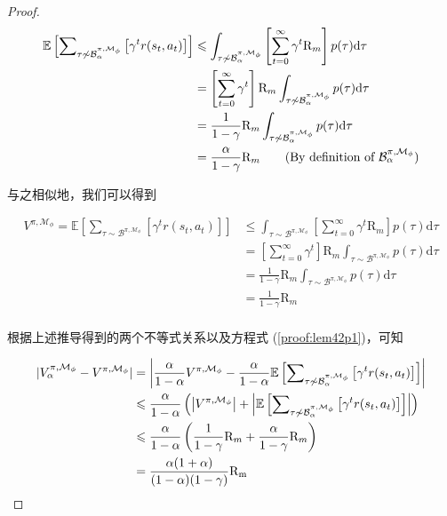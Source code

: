 \begin{proof}
\begin{align*}
\mathbb{E}\left[{\sum}_{\tau \not\sim\mathcal{B}_\alpha^{\pi,\mathcal{M}_\phi}}\left[\gamma^t r(s_t,a_t)\right]\right] &\leq\int_{\tau\not\sim{\mathcal{B}_\alpha^{\pi,\mathcal{M}_\phi}}}\left[\sum_{t=0}^\infty\gamma^t \mathrm{R}_m\right]p(\tau)\mathrm{d}\tau\\
&=\left[\sum_{t=0}^\infty\gamma^t\right]\mathrm{R}_m\int_{\tau\not\sim{\mathcal{B}_\alpha^{\pi,\mathcal{M}_\phi}}}p(\tau)\mathrm{d}\tau\\
&= \frac{1}{1-\gamma}\mathrm{R}_m \int_{\tau\not\sim{\mathcal{B}_\alpha^{\pi,\mathcal{M}_\phi}}}p(\tau)\mathrm{d}\tau\\
&=\frac{\alpha}{1-\gamma}\mathrm{R}_m \tag{By definition of $\mathcal{B}_\alpha^{\pi,\mathcal{M}_\phi}$}\\
\end{align*}

与之相似地，我们可以得到

\begin{align*}
V^{\pi,\mathcal{M}_\phi} = \mathbb{E}\left[{\sum}_{\tau \sim\mathcal{B}^{\pi,\mathcal{M}_\phi}}\left[\gamma^t r(s_t,a_t)\right]\right] &\leq\int_{\tau \sim\mathcal{B}^{\pi,\mathcal{M}_\phi}}\left[\sum_{t=0}^\infty\gamma^t \mathrm{R}_m\right]p(\tau)\mathrm{d}\tau\\
&=\left[\sum_{t=0}^\infty\gamma^t\right]\mathrm{R}_m\int_{\tau \sim\mathcal{B}^{\pi,\mathcal{M}_\phi}}p(\tau)\mathrm{d}\tau\\
&= \frac{1}{1-\gamma}\mathrm{R}_m \int_{\tau \sim\mathcal{B}^{\pi,\mathcal{M}_\phi}}p(\tau)\mathrm{d}\tau\\
&=\frac{1}{1-\gamma}\mathrm{R}_m\\
\end{align*}

根据上述推导得到的两个不等式关系以及方程式 (\ref{proof:lem42p1})，可知

\begin{align}
|{V}_\alpha^{\pi, \mathcal{M}_{\phi}} - {V}^{\pi,\mathcal{M}_{\phi}}| &=  \left|\frac{\alpha}{1-\alpha}V^{\pi,\mathcal{M}_\phi}-\frac{\alpha}{1-\alpha}\mathbb{E}\left[{\sum}_{\tau \not\sim\mathcal{B}_\alpha^{\pi,\mathcal{M}_\phi}}\left[\gamma^t r(s_t,a_t)\right]\right]\right| \notag\\
&\leq\frac{\alpha}{1-\alpha}\left(\left|V^{\pi,\mathcal{M}_\phi}\right|+\left|\mathbb{E}\left[{\sum}_{\tau \not\sim\mathcal{B}_\alpha^{\pi,\mathcal{M}_\phi}}\left[\gamma^t r(s_t,a_t)\right]\right]\right|\right)\notag\\
&\leq \frac{\alpha}{1-\alpha}\left(\frac{1}{1-\gamma}\mathrm{R}_m+\frac{\alpha}{1-\gamma}\mathrm{R}_m\right) \notag\\
&=\frac{\alpha(1+\alpha)}{(1-\alpha)(1-\gamma)}\mathrm{R_{m}} \label{eq:lem42}
\end{align}

\end{proof}


